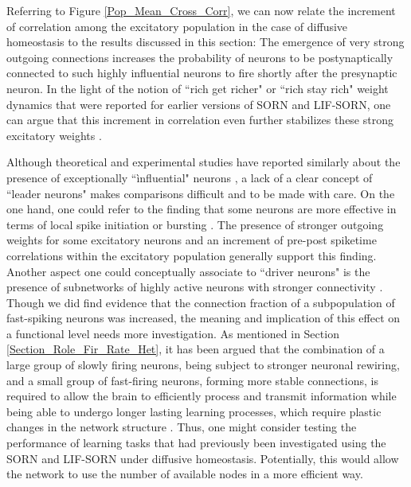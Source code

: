 \documentclass[10pt,a4paper]{article}
\begin{document}
Referring to Figure \ref{Pop_Mean_Cross_Corr}, we can now relate the increment of correlation among the excitatory population in the case of diffusive homeostasis to the results discussed in this section: The emergence of very strong outgoing connections increases the probability of neurons to be postynaptically connected to such highly influential neurons to fire shortly after the presynaptic neuron. In the light of the notion of ``rich get richer" or ``rich stay rich" weight dynamics that were reported for earlier versions of SORN and LIF-SORN, one can argue that this increment in correlation even further stabilizes these strong excitatory weights \cite{Pengsheng_2013,SORN_Paper}.

Although theoretical and experimental studies have reported similarly about the presence of exceptionally ``ìnfluential" neurons \cite{Effenberger_2015,Yassin_Subnetworks_2010,Eckmann_Leader_Neurons_2008}, a lack of a clear concept of ``leader neurons" makes comparisons difficult and to be made with care. On the one hand, one could refer to the finding that some neurons are more effective in terms of local spike initiation or bursting \cite{Eckmann_Leader_Neurons_2008}. The presence of stronger outgoing weights for some excitatory neurons and an increment of pre-post spiketime correlations within the excitatory population generally support this finding. Another aspect one could conceptually associate to ``driver neurons" is the presence of subnetworks of highly active neurons with stronger connectivity \cite{Yassin_Subnetworks_2010}. Though we did find evidence that the connection fraction of a subpopulation of fast-spiking neurons was increased, the meaning and implication of this effect on a functional level needs more investigation. As mentioned in Section \ref{Section_Role_Fir_Rate_Het}, it has been argued that the combination of a large group of slowly firing neurons, being subject to stronger neuronal rewiring, and a small group of fast-firing neurons, forming more stable connections, is required to allow the brain to efficiently process and transmit information while being able to undergo longer lasting learning processes, which require plastic changes in the network structure \cite{Dragoi_2003,Buzsaki_2004,Buzsaki_Fir_Rates_2014}. Thus, one might consider testing the performance of learning tasks that had previously been investigated using the SORN and LIF-SORN under diffusive homeostasis. Potentially, this would allow the network to use the number of available nodes in a more efficient way.
\end{document}
